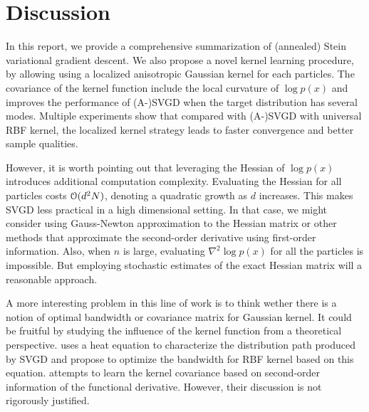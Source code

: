 \section{Discussion} \label{sec:discuss}

In this report, we provide a comprehensive summarization of (annealed) Stein variational gradient descent. We also propose a novel kernel learning procedure, by allowing using a localized anisotropic Gaussian kernel for each particles. The covariance of the kernel function include the local curvature of $\log p(x)$ and improves the performance of (A-)SVGD when the target distribution has several modes. Multiple experiments show that compared with (A-)SVGD with universal RBF kernel, the localized kernel strategy leads to faster convergence and better sample qualities.

However, it is worth pointing out that leveraging the Hessian of $\log p(x)$ introduces additional computation complexity. Evaluating the Hessian for all particles costs $\mathcal{O}(d^2N)$, denoting a quadratic growth as $d$ increases. This makes SVGD less practical in a high dimensional setting. In that case, we might consider using Gauss-Newton approximation to the Hessian matrix or other methods that approximate the second-order derivative using first-order information.
Also, when $n$ is large, evaluating $\nabla^2 \log p(x)$ for all the particles is impossible. But employing  stochastic estimates of the exact Hessian matrix will a reasonable approach.  

A more interesting problem in this line of work is to think wether there is a notion of optimal bandwidth or covariance matrix for Gaussian kernel.    It could be fruitful by studying the influence of the kernel function from a theoretical perspective. \citet{liu2019understanding} uses a heat equation to characterize the distribution path produced by SVGD and propose to optimize  the bandwidth for RBF kernel based on this equation. \citet{detommaso2018stein} attempts to learn the kernel covariance based on second-order information of the functional derivative. However, their discussion is not rigorously justified. 
